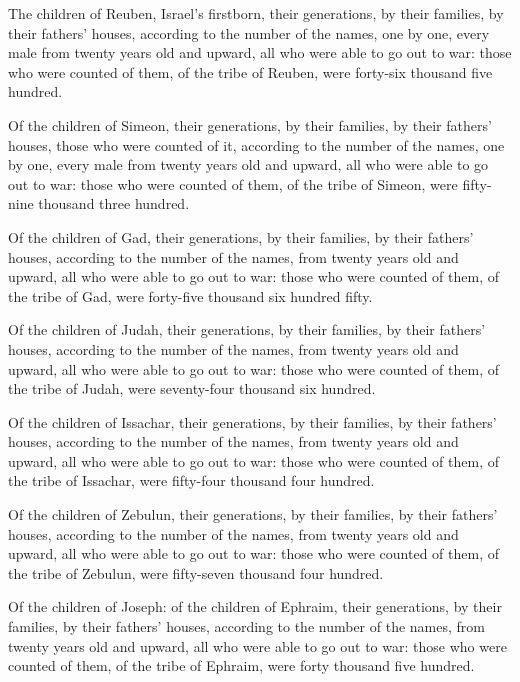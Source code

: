  The children of Reuben, Israel's firstborn, their
generations, by their families, by their fathers' houses, according to
the number of the names, one by one, every male from twenty years old
and upward, all who were able to go out to war:  those who
were counted of them, of the tribe of Reuben, were forty-six thousand
five hundred.

 Of the children of Simeon, their generations, by their
families, by their fathers' houses, those who were counted of it,
according to the number of the names, one by one, every male from twenty
years old and upward, all who were able to go out to war: 
those who were counted of them, of the tribe of Simeon, were fifty-nine
thousand three hundred.

 Of the children of Gad, their generations, by their
families, by their fathers' houses, according to the number of the
names, from twenty years old and upward, all who were able to go out to
war:  those who were counted of them, of the tribe of Gad,
were forty-five thousand six hundred fifty.

 Of the children of Judah, their generations, by their
families, by their fathers' houses, according to the number of the
names, from twenty years old and upward, all who were able to go out to
war:  those who were counted of them, of the tribe of
Judah, were seventy-four thousand six hundred.

 Of the children of Issachar, their generations, by their
families, by their fathers' houses, according to the number of the
names, from twenty years old and upward, all who were able to go out to
war:  those who were counted of them, of the tribe of
Issachar, were fifty-four thousand four hundred.

 Of the children of Zebulun, their generations, by their
families, by their fathers' houses, according to the number of the
names, from twenty years old and upward, all who were able to go out to
war:  those who were counted of them, of the tribe of
Zebulun, were fifty-seven thousand four hundred.

 Of the children of Joseph: of the children of Ephraim,
their generations, by their families, by their fathers' houses,
according to the number of the names, from twenty years old and upward,
all who were able to go out to war:  those who were counted
of them, of the tribe of Ephraim, were forty thousand five hundred.

